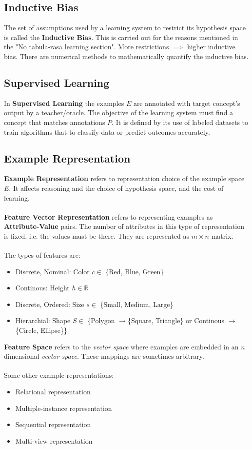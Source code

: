 \documentclass[12pt, a4paper]{book}
\begin{document}
\subsection{Inductive Bias}
The set of assumptions used by a learning system to restrict its hypothesis space is called the \textbf{Inductive Bias}. This is carried out for the reasons mentioned in the "No tabula-rasa learning section". More restrictions $\implies$ higher inductive bias. There are numerical methods to mathematically quantify the inductive bias.

\subsection{Supervised Learning}
In \textbf{Supervised Learning} the examples $E$ are annotated with target concept’s output by a teacher/oracle. The objective of the learning system must find a concept that matches annotations $P$. It is defined by its use of labeled datasets to train algorithms that to classify data or predict outcomes accurately.

\subsection{Example Representation}
\textbf{Example Representation} refers to representation choice of the example space $E$. It affects reasoning and the choice of hypothesis space, and the cost of learning.\\\\
\textbf{Feature Vector Representation} refers to representing examples as \textbf{Attribute-Value} pairs. The number of attributes in this type of representation is fixed, i.e. the values must be there. They are represented as $m \times n$ matrix.\\\\
The types of features are:
\begin{itemize}
    \item Discrete, Nominal: Color $c \in $ \{Red, Blue, Green\}
    \item Continous: Height $h \in \mathbb{R}$
    \item Discrete, Ordered: Size $s \in $ \{Small, Medium, Large\}
    \item Hierarchial: Shape $S \in $ \{Polygon $\to$\{Square, Triangle\} or Continous $\to$ \{Circle, Ellipse\}\}\\
\end{itemize}
\textbf{Feature Space} refers to the \textit{vector space} where examples are embedded in an $n$ dimensional \textit{vector space}. These mappings are sometimes arbitrary.\\\\
Some other example representations:
\begin{itemize}
    \item Relational representation
    \item Multiple-instance representation
    \item Sequential representation
    \item Multi-view representation
\end{itemize}
\end{document}
